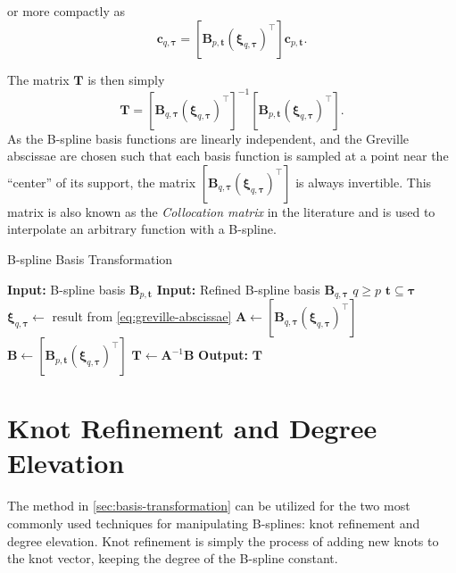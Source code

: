 or more compactly as
\begin{equation}
    [\mathbf B_{q,\boldsymbol \tau}(\boldsymbol \xi_{q,\boldsymbol \tau})^\top] \mathbf c_{q, \boldsymbol \tau} = [\mathbf B_{p,\mathbf t}(\boldsymbol \xi_{q,\boldsymbol \tau})^\top] \mathbf c_{p, \mathbf t}.
\end{equation}

The matrix $\mathbf T$ is then simply
\begin{equation}\label{eq:transformation-matrix-solution}
    \mathbf T = [\mathbf B_{q,\boldsymbol \tau}(\boldsymbol \xi_{q,\boldsymbol \tau})^\top]^{-1} [\mathbf B_{p,\mathbf t}(\boldsymbol \xi_{q,\boldsymbol \tau})^{\top}].
\end{equation}
As the B-spline basis functions are linearly independent, and the Greville abscissae are chosen such that each basis function is sampled at a point near the ``center'' of its support, the matrix $[\mathbf B_{q,\boldsymbol \tau}(\boldsymbol \xi_{q,\boldsymbol \tau})^\top]$ is always invertible. This matrix is also known as the \emph{Collocation matrix} in the literature  and is used to interpolate an arbitrary function with a B-spline.

\begin{algorithm}
    \caption{B-spline Basis Transformation}\label{alg:basis-transformation}
    \begin{algorithmic}[1]
        \State \textbf{Input:} B-spline basis $\mathbf{B}_{p,\mathbf{t}}$
        \State \textbf{Input:} Refined B-spline basis $\mathbf B_{q,\boldsymbol \tau}$
        \Ensure $q \geq p$
        \Ensure $\mathbf t \subseteq \boldsymbol \tau$
        \State $\boldsymbol \xi_{q, \boldsymbol \tau} \gets$ result from \cref{eq:greville-abscissae}
        \State $\mathbf A \gets [\mathbf B_{q,\boldsymbol \tau}(\boldsymbol \xi_{q,\boldsymbol \tau})^\top]$
        \State $\mathbf B \gets [\mathbf B_{p,\mathbf t}(\boldsymbol \xi_{q,\boldsymbol \tau})^\top]$
        \State $\mathbf T \gets \mathbf A^{-1} \mathbf B$
        \State \textbf{Output:} $\mathbf T$
    \end{algorithmic}
\end{algorithm}

\section{Knot Refinement and Degree Elevation}
The method in \cref{sec:basis-transformation} can be utilized for the two most commonly used techniques for manipulating B-splines: knot refinement and degree elevation. Knot refinement is simply the process of adding new knots to the knot vector, keeping the degree of the B-spline constant. 

